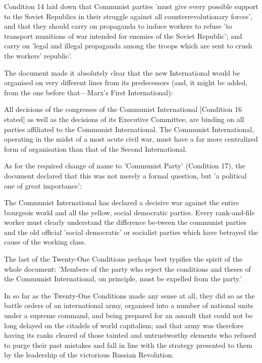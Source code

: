 Condition 14 laid down that Communist parties 'must give every possible support to the Soviet Republics in their struggle against all counterrevolutionary forces', and that they should carry on propaganda to induce workers to refuse 'to transport munitions of war intended for enemies of the Soviet Republic'; and carry on 'legal and illegal propaganda among the troops which are sent to crush the workers' republic'.

The document made it absolutely clear that the new International would be organised on very different lines from its predecessors (and, it might be added, from the one before that—Marx's First International):
\begin{displayquote}
    All decisions of the congresses of the Communist International [Condition 16 stated] as well as the decisions of its Executive Committee, are binding on all parties affiliated to the Communist International. The Communist International, operating in the midst of a most acute civil war, must have a far more centralized form of organisation than that of the Second International.
\end{displayquote}

As for the required change of name to 'Communist Party' (Condition 17), the document declared that this was not merely a formal question, but 'a political one of great importance':
\begin{displayquote}
    The Communist International has declared a decisive war against the entire bourgeois world and all the yellow, social democratic parties. Every rank-and-file worker must clearly understand the difference be\hyp{}tween the communist parties and the old official 'social democratic' or socialist parties which have betrayed the cause of the working class.
\end{displayquote}

The last of the Twenty-One Conditions perhaps best typifies the spirit of the whole document: 'Members of the party who reject the conditions and theses of the Communist International, on principle, must be expelled from the party.'

In so far as the Twenty-One Conditions made any sense at all, they did so as the battle orders of an international army, organised into a number of national units under a supreme command, and being prepared for an assault that could not be long delayed on the citadels of world capitalism; and that army was therefore having its ranks cleared of those tainted and untrustworthy elements who refused to purge their past mistakes and fall in line with the strategy presented to them by the leadership of the victorious Russian Revolution.

